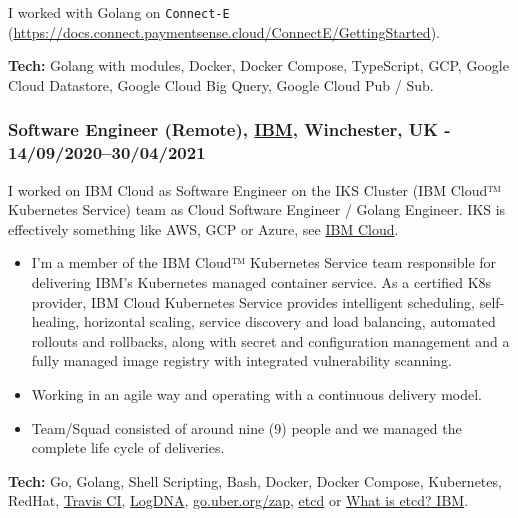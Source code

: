 \documentclass[
  a4paper,
  8pt,
]{article}
\providecommand{\tightlist}{%
  \setlength{\itemsep}{0pt}\setlength{\parskip}{0pt}}
\begin{document}
\begin{multicols}{2}
I worked with Golang on \texttt{Connect-E}
(\url{https://docs.connect.paymentsense.cloud/ConnectE/GettingStarted}).

\textbf{Tech:} Golang with modules, Docker, Docker Compose, TypeScript,
GCP, Google Cloud Datastore, Google Cloud Big Query, Google Cloud Pub /
Sub.

\hypertarget{software-engineer-remote-ibm-winchester-uk---1409202030042021}{%
\subsubsection{\texorpdfstring{Software Engineer (Remote),
\href{https://www.ibm.com/uk/en/}{IBM}, Winchester, UK -
14/09/2020--30/04/2021}{Software Engineer (Remote), IBM, Winchester, UK - 14/09/2020--30/04/2021}}\label{software-engineer-remote-ibm-winchester-uk---1409202030042021}}

I worked on IBM Cloud as Software Engineer on the IKS Cluster (IBM
Cloud™ Kubernetes Service) team as Cloud Software Engineer / Golang
Engineer. IKS is effectively something like AWS, GCP or Azure, see
\href{https://cloud.ibm.com/}{IBM Cloud}.

\begin{itemize}
\tightlist
\item
  I'm a member of the IBM Cloud™ Kubernetes Service team responsible for
  delivering IBM's Kubernetes managed container service. As a certified
  K8s provider, IBM Cloud Kubernetes Service provides intelligent
  scheduling, self-healing, horizontal scaling, service discovery and
  load balancing, automated rollouts and rollbacks, along with secret
  and configuration management and a fully managed image registry with
  integrated vulnerability scanning.
\item
  Working in an agile way and operating with a continuous delivery
  model.
\item
  Team/Squad consisted of around nine (9) people and we managed the
  complete life cycle of deliveries.
\end{itemize}

\textbf{Tech:} Go, Golang, Shell Scripting, Bash, Docker, Docker
Compose, Kubernetes, RedHat, \href{https://travis-ci.org/}{Travis CI},
\href{https://logdna.com/}{LogDNA},
\href{https://github.com/uber-go/zap}{go.uber.org/zap},
\href{https://etcd.io/}{etcd} or
\href{https://www.ibm.com/cloud/learn/etcd}{What is etcd? \textbar{}
IBM}.

\hypertarget{full-stack-software-engineer-open-banking-limited-london-uk---0805201801012020}{%
}
\end{multicols}
\end{document}
